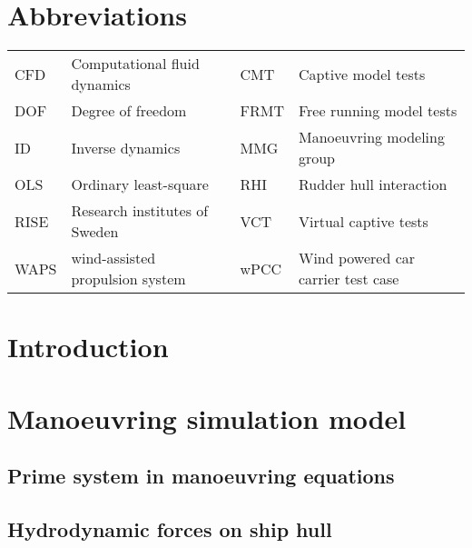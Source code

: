 \documentclass[preprint,11pt,authoryear]{elsarticle}
\begin{document}
\section*{Abbreviations}
\label{sec:introduction}
\begin{table}[h]
    \centering
    \scriptsize
    \label{tab:abbreviations}
    \begin{tabular}{l l l l}

    CFD & Computational fluid dynamics & CMT & Captive model tests \\
    
    DOF & Degree of freedom &  FRMT & Free running model tests \\
    ID & Inverse dynamics &  MMG & Manoeuvring modeling group \\
    OLS & Ordinary least-square &  RHI & Rudder hull interaction \\
    RISE & Research institutes of Sweden &  VCT & Virtual captive tests \\
    WAPS & wind-assisted propulsion system &  wPCC & Wind powered car carrier test case\\
    \end{tabular}
        
\end{table}
\FloatBarrier

\section{Introduction}
\label{sec:introduction}


\section{Manoeuvring simulation model} \label{sec:model}

%

\subsection{Prime system in manoeuvring equations}
\label{sec:prime_system}


\FloatBarrier
\subsection{Hydrodynamic forces on ship hull}

\end{document}
